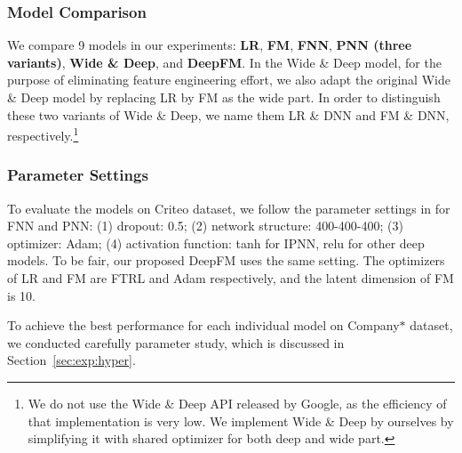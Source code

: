 \subsubsection{Model Comparison}\label{sec:exp:set:comparemodel}

We compare 9 models in our experiments: \textbf{LR}, \textbf{FM}, \textbf{FNN}, \textbf{PNN (three variants)}, \textbf{Wide \& Deep}, and \textbf{DeepFM}. In the Wide \& Deep model, for the purpose of eliminating feature engineering effort, we also adapt the original Wide \& Deep model by replacing LR by FM as the wide part. In order to distinguish these two variants of Wide \& Deep, we name them LR \& DNN and FM \& DNN, respectively.\footnote{We do not use the Wide \& Deep API released by Google, as the efficiency of that implementation is very low. We implement Wide \& Deep by ourselves by simplifying it with shared optimizer for both deep and wide part.}

\subsubsection{Parameter Settings}\label{sec:exp:set:hyper}

To evaluate the models on Criteo dataset, we follow the parameter settings in \cite{pnn} for FNN and PNN: (1) dropout: 0.5; (2) network structure: 400-400-400; (3) optimizer: Adam; (4) activation function: tanh for IPNN, relu for other deep models. To be fair, our proposed DeepFM uses the same setting. The optimizers of LR and FM are FTRL and Adam respectively, and the latent dimension of FM is 10.

To achieve the best performance for each individual model on Company$\ast$ dataset, we conducted carefully parameter study, which is discussed in Section~\ref{sec:exp:hyper}.
%
%
%

